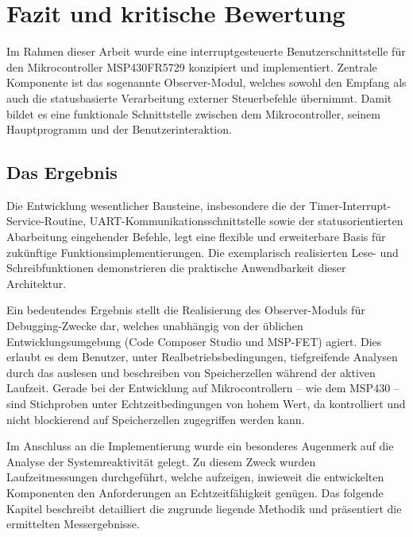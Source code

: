 

\chapter{Fazit und kritische Bewertung}
\label{cha:Fazit}

Im Rahmen dieser Arbeit wurde eine interruptgesteuerte Benutzerschnittstelle f\"ur den Mikrocontroller MSP430FR5729 konzipiert und implementiert. Zentrale Komponente ist das sogenannte Observer-Modul, welches sowohl den Empfang als auch die statusbasierte Verarbeitung externer Steuerbefehle \"ubernimmt. Damit bildet es eine funktionale Schnittstelle zwischen dem Mikrocontroller, seinem Hauptprogramm und der Benutzerinteraktion.


\section{Das Ergebnis}
\label{sec:Ergebnis}

Die Entwicklung wesentlicher Bausteine, insbesondere die der Timer-Interrupt-Service-Routine, UART-Kommunikationsschnittstelle sowie der statusorientierten Abarbeitung eingehender Befehle, legt eine flexible und erweiterbare Basis f\"ur zuk\"unftige Funktionsimplementierungen. Die exemplarisch realisierten Lese- und Schreibfunktionen demonstrieren die praktische Anwendbarkeit dieser Architektur.

Ein bedeutendes Ergebnis stellt die Realisierung des Observer-Moduls f\"ur Debugging-Zwecke dar, welches unabh\"angig von der \"ublichen Entwicklungsumgebung (Code Composer Studio und MSP-FET) agiert. Dies erlaubt es dem Benutzer, unter Realbetriebsbedingungen, tiefgreifende Analysen durch das auslesen und beschreiben von Speicherzellen w\"ahrend der aktiven Laufzeit. Gerade bei der Entwicklung auf Mikrocontrollern -- wie dem MSP430 -- sind Stichproben unter Echtzeitbedingungen von hohem Wert, da kontrolliert und nicht blockierend auf Speicherzellen zugegriffen werden kann.

Im Anschluss an die Implementierung wurde ein besonderes Augenmerk auf die Analyse der Systemreaktivit\"at gelegt. Zu diesem Zweck wurden Laufzeitmessungen durchgef\"uhrt, welche aufzeigen, inwieweit die entwickelten Komponenten den Anforderungen an Echtzeitf\"ahigkeit gen\"ugen. Das folgende Kapitel beschreibt detailliert die zugrunde liegende Methodik und pr\"asentiert die ermittelten Messergebnisse.\AI


